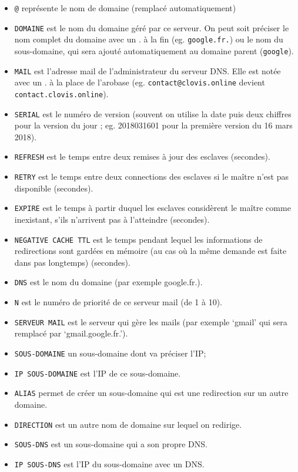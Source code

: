 \documentclass[10pt,a4paper,french]{article}
\begin{document}
\begin{itemize}
\item {\tt @} représente le nom de domaine (remplacé automatiquement)
\item {\tt DOMAINE} est le nom du domaine géré par ce serveur. On peut soit préciser le nom complet du domaine avec un . à la fin (eg. {\tt google.fr.}) ou le nom du sous-domaine, qui sera ajouté automatiquement au domaine parent ({\tt google}).
\item {\tt MAIL} est l'adresse mail de l'administrateur du serveur DNS. Elle est notée avec un . à la place de l'arobase (eg. {\tt contact@clovis.online} devient {\tt contact.clovis.online}).
\item {\tt SERIAL} est le numéro de version (souvent on utilise la date puis deux chiffres pour la version du jour ; eg. 2018031601 pour la première version du 16 mars 2018).
\item {\tt REFRESH} est le temps entre deux remises à jour des esclaves (secondes).
\item {\tt RETRY} est le temps entre deux connections des esclaves si le maître n'est pas disponible (secondes).
\item {\tt EXPIRE} est le temps à partir duquel les esclaves considèrent le maître comme inexistant, s'ils n'arrivent pas à l'atteindre (secondes).
\item {\tt NEGATIVE CACHE TTL} est le temps pendant lequel les informations de redirections sont gardées en mémoire (au cas où la même demande est faite dans pas longtemps) (secondes).
\item {\tt DNS} est le nom du domaine (par exemple google.fr.).
\item {\tt N} est le numéro de priorité de ce serveur mail (de 1 à 10).
\item {\tt SERVEUR MAIL} est le serveur qui gère les mails (par exemple `gmail' qui sera remplacé par `gmail.google.fr.').
\item {\tt SOUS-DOMAINE} un sous-domaine dont va préciser l'IP;
\item {\tt IP SOUS-DOMAINE} est l'IP de ce sous-domaine.
\item {\tt ALIAS} permet de créer un sous-domaine qui est une redirection sur un autre domaine.
\item {\tt DIRECTION} est un autre nom de domaine sur lequel on redirige.
\item {\tt SOUS-DNS} est un sous-domaine qui a son propre DNS.
\item {\tt IP SOUS-DNS} est l'IP du sous-domaine avec un DNS.
\end{itemize}
\end{document}
